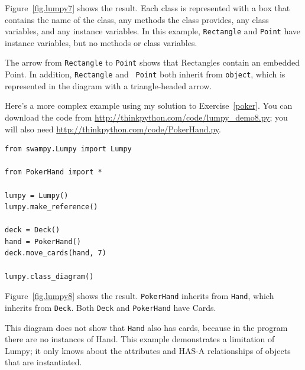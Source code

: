 \documentclass[10pt]{book}
\begin{document}
Figure~\ref{fig.lumpy7} shows the result.  
Each class is represented with a box that contains the name of the
class, any methods the class provides, any class variables, and
any instance variables.  In this example, {\tt Rectangle} and {\tt Point}
have instance variables, but no methods or class variables.

The arrow from {\tt Rectangle} to {\tt Point} shows that Rectangles
contain an embedded Point.  In addition, {\tt Rectangle} and {\tt
  Point} both inherit from {\tt object}, which is represented in
the diagram with a triangle-headed arrow.

Here's a more complex example using my solution to Exercise~\ref{poker}.
You can download
the code from \url{http://thinkpython.com/code/lumpy_demo8.py};
you will also need \url{http://thinkpython.com/code/PokerHand.py}.

\begin{verbatim}
from swampy.Lumpy import Lumpy

from PokerHand import *

lumpy = Lumpy()
lumpy.make_reference()

deck = Deck()
hand = PokerHand()
deck.move_cards(hand, 7)

lumpy.class_diagram()
\end{verbatim}

Figure~\ref{fig.lumpy8} shows the result.  
{\tt PokerHand} inherits from {\tt Hand}, which inherits from {\tt Deck}.
Both {\tt Deck} and {\tt PokerHand} have Cards.

This diagram does not show that {\tt Hand} also has cards, because
in the program there are no instances of Hand.  This example
demonstrates a limitation of Lumpy; it only knows about the
attributes and HAS-A relationships of objects that are instantiated.

\printindex

\clearemptydoublepage
\end{document}
